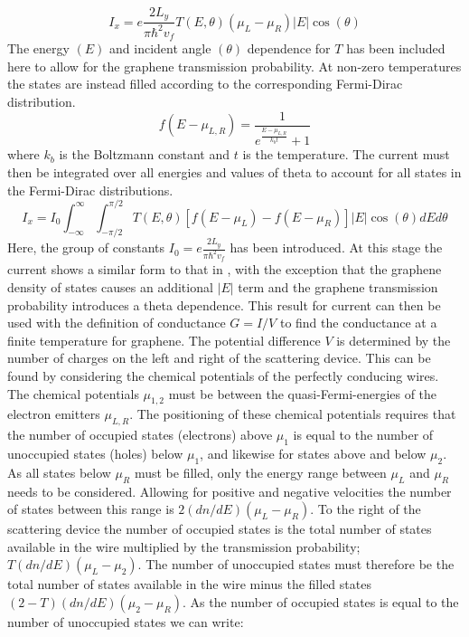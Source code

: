 			\begin{equation}
				I_{x}=e\frac{2L_{y}}{\pi \hbar^{2}v_{f}}T\left(E,\theta\right)\left(\mu_{L}-\mu_{R}\right)|E|\cos(\theta)
			\end{equation}
			The energy $\left(E\right)$ and incident angle $\left(\theta\right)$ dependence for $T$ has been included here to allow for the graphene transmission probability. At non-zero temperatures the states are instead filled according to the corresponding Fermi-Dirac distribution.
			\begin{equation}
				f\left(E-\mu_{L,R}\right)=\frac{1}{e^{\frac{E-\mu_{L,R}}{k_{b}t}}+1}
			\end{equation}
			where $k_{b}$ is the Boltzmann constant and $t$ is the temperature. The current must then be integrated over all energies and values of theta to account for all states in the Fermi-Dirac distributions.
			\begin{equation}
				I_{x}=I_{0}\int^{\infty}_{-\infty}\int^{\pi/2}_{-\pi/2}T\left(E,\theta\right)\left[f\left(E-\mu_{L}\right)-f\left(E-\mu_{R}\right)\right]|E|\cos(\theta)dEd\theta
				\label{introduction-i-graphene}
			\end{equation}
			Here, the group of constants $I_{0}=e\frac{2L_{y}}{\pi\hbar^{2}v_{f}}$ has been introduced. At this stage the current shows a similar form to that in \cite{b9, b10}, with the exception that the graphene density of states causes an additional $|E|$ term and the graphene transmission probability introduces a theta dependence. This result for current can then be used with the definition of conductance $G=I/V$ to find the conductance at a finite temperature for graphene. The potential difference $V$ is determined by the number of charges on the left and right of the scattering device. This can be found by considering the chemical potentials of the perfectly conducing wires. The chemical potentials $\mu_{1,2}$ must be between the quasi-Fermi-energies of the electron emitters $\mu_{L,R}$. The positioning of these chemical potentials requires that the number of occupied states (electrons) above $\mu_{1}$ is equal to the number of unoccupied states (holes) below $\mu_{1}$, and likewise for states above and below $\mu_{2}$. As all states below $\mu_{R}$ must be filled, only the energy range between $\mu_{L}$ and $\mu_{R}$ needs to be considered. Allowing for positive and negative velocities the number of states between this range is $2\left(dn/dE\right)\left(\mu_{L}-\mu_{R}\right)$. To the right of the scattering device the number of occupied states is the total number of states available in the wire multiplied by the transmission probability; $T\left(dn/dE\right)\left(\mu_{L}-\mu_{2}\right)$. The number of unoccupied states must therefore be the total number of states available in the wire minus the filled states $\left(2-T\right)\left(dn/dE\right)\left(\mu_{2}-\mu_{R}\right)$. As the number of occupied states is equal to the number of unoccupied states we can write:
